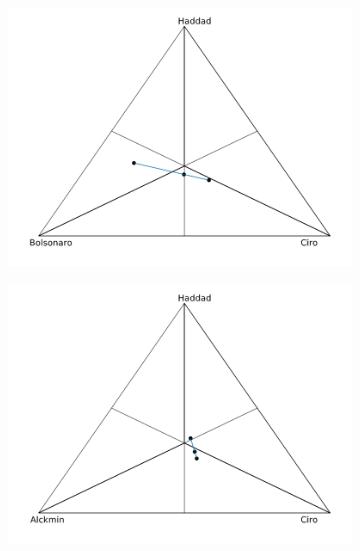 \documentclass[hidelinks,11pt]{article}
\begin{document}
   \begin{figure}[H]
        \centering
        \begin{subfigure}[b]{0.475\textwidth}
            \centering
            \includegraphics[width=\textwidth]{./images/cw1_nota.png}
             \caption{}%
            \label{fig:notac1}
        \end{subfigure}
        \hfill
        \begin{subfigure}[b]{0.475\textwidth}
            \centering
            \includegraphics[width=\textwidth]{./images/cw1_notb.png}
             \caption{}%
            \label{fig:notbc1}
        \end{subfigure}

\end{figure}
\end{document}
